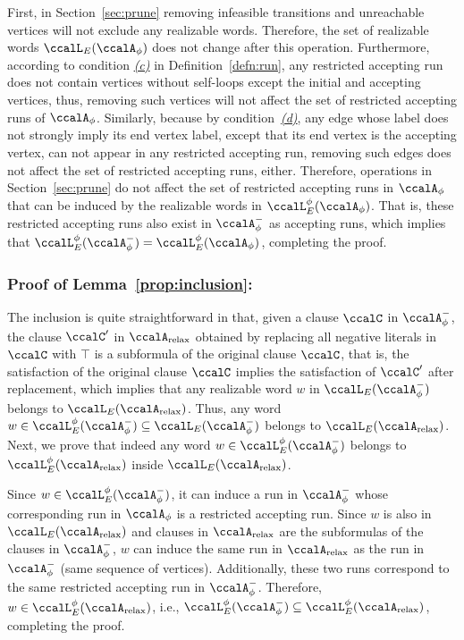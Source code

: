 \documentclass[Afour,sageh,times]{sagej}
\newcommand{\auto}[1]{\ccalA_{\textup{#1}}}
\newcommand{\autop}{\ccalA_{\phi}}
\begin{document}
{{First, in Section~\ref{sec:prune} removing infeasible transitions and unreachable vertices will not exclude any realizable words. Therefore, the set of realizable words $\ccalL_E(\autop)$ does not change after this operation. Furthermore, according to condition \hyperref[cond:c]{\it (c)} in Definition~\ref{defn:run}, any restricted  accepting run  does not contain vertices without self-loops except the initial and accepting vertices, thus, removing such vertices  will not affect the  set of restricted accepting runs of $\autop$. Similarly, because by condition~\hyperref[cond:d]{\it (d)}, any edge whose label does not strongly imply its end vertex label, except that its end vertex is the accepting vertex,  can not appear in any restricted accepting run, removing such edges does not affect the set of restricted accepting runs, either.  Therefore, operations in Section~\ref{sec:prune}  do not affect the set of restricted accepting runs in $\autop$ that can be induced by the realizable words  in $\ccalL^\phi_E(\autop)$. That is, these restricted accepting runs also exist in $\autop^-$ as accepting runs, which implies that $\ccalL^\phi_E(\autop^-) = \ccalL^\phi_E(\autop)$, completing the proof.


\subsubsection{Proof of Lemma~\ref{prop:inclusion}:}\label{app:inclusion}
The inclusion is quite straightforward in that, given a clause $\ccalC$ in $\autop^-$, the clause $\ccalC'$ in $\auto{relax}$ obtained by replacing all negative literals in $\ccalC$ with $\top$ is a subformula of the original clause $\ccalC$, that is, the satisfaction of the original clause $\ccalC$ implies the satisfaction of $\ccalC'$ after replacement, which implies that any realizable word $w$ in $\ccalL_E(\autop^-)$ belongs to $\ccalL_E(\auto{relax})$. Thus, any word $w \in \ccalL^\phi_E(\autop^-)  \subseteq  \ccalL_E(\autop^-)$ belongs to $\ccalL_E(\auto{relax})$. Next, we prove that indeed any word $w \in \ccalL^\phi_E(\autop^-)$ belongs to  $\ccalL^\phi_E(\auto{relax})$ inside $ \ccalL_E(\auto{relax})$.

Since $w \in \ccalL^\phi_E(\autop^-)$, it can induce  a run in $\autop^-$ whose corresponding run in $\autop$ is a restricted accepting run. Since $w$ is also in $\ccalL_E(\auto{relax})$ and clauses in $\auto{relax}$ are the subformulas of the clauses in $\autop^-$, $w$ can induce the same run in $\auto{relax}$ as the run in $\autop^-$ (same sequence of vertices). Additionally, these two runs correspond to the same restricted accepting run in $\autop^-$. Therefore, $w \in \ccalL^\phi_E(\auto{relax})$, i.e.,  $\ccalL^\phi_E(\autop^-)\subseteq \ccalL^\phi_E(\auto{relax})$, completing the proof.

}}
\end{document}
